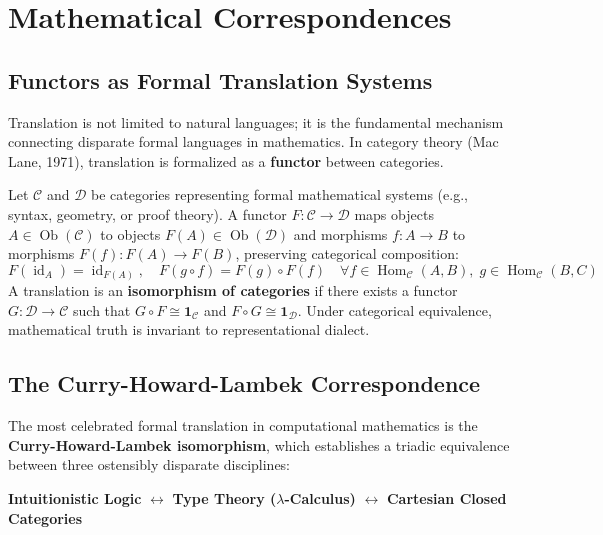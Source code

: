 \documentclass[11pt,letterpaper]{article}
\begin{document}
\section{Mathematical Correspondences}

\subsection{Functors as Formal Translation Systems}
Translation is not limited to natural languages; it is the fundamental mechanism connecting disparate formal languages in mathematics. In category theory (Mac Lane, 1971), translation is formalized as a \textbf{functor} between categories.

Let $\mathcal{C}$ and $\mathcal{D}$ be categories representing formal mathematical systems (e.g., syntax, geometry, or proof theory). A functor $F: \mathcal{C} \to \mathcal{D}$ maps objects $A \in \operatorname{Ob}(\mathcal{C})$ to objects $F(A) \in \operatorname{Ob}(\mathcal{D})$ and morphisms $f: A \to B$ to morphisms $F(f): F(A) \to F(B)$, preserving categorical composition:
\begin{equation}
F(\operatorname{id}_A) = \operatorname{id}_{F(A)}, \quad F(g \circ f) = F(g) \circ F(f) \quad \forall f \in \operatorname{Hom}_{\mathcal{C}}(A, B), \; g \in \operatorname{Hom}_{\mathcal{C}}(B, C)
\end{equation}
A translation is an \textbf{isomorphism of categories} if there exists a functor $G: \mathcal{D} \to \mathcal{C}$ such that $G \circ F \cong \mathbf{1}_{\mathcal{C}}$ and $F \circ G \cong \mathbf{1}_{\mathcal{D}}$. Under categorical equivalence, mathematical truth is invariant to representational dialect.

\subsection{The Curry-Howard-Lambek Correspondence}
The most celebrated formal translation in computational mathematics is the \textbf{Curry-Howard-Lambek isomorphism}, which establishes a triadic equivalence between three ostensibly disparate disciplines:
\begin{center}
\textbf{Intuitionistic Logic} \quad $\longleftrightarrow$ \quad \textbf{Type Theory ($\lambda$-Calculus)} \quad $\longleftrightarrow$ \quad \textbf{Cartesian Closed Categories}
\end{center}
\end{document}
